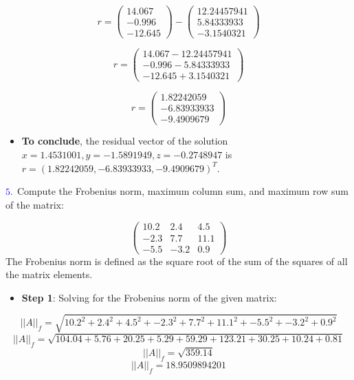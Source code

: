 \documentclass[
]{article}
\providecommand{\tightlist}{%
  \setlength{\itemsep}{0pt}\setlength{\parskip}{0pt}}
\begin{document}
\[r = 
  \begin{pmatrix}
    14.067 \\
    -0.996 \\
    -12.645 
  \end{pmatrix}
  -
  \begin{pmatrix}
    12.24457941\\
    5.84333933\\
    -3.1540321 
  \end{pmatrix}\]

\[r = 
  \begin{pmatrix}
    14.067 - 12.24457941 \\
    -0.996 - 5.84333933\\
    -12.645 +3.1540321
  \end{pmatrix}
  \]

\[r = 
  \begin{pmatrix}
    1.82242059 \\
    -6.83933933\\
    -9.4909679
  \end{pmatrix}
  \]

\begin{itemize}
\tightlist
\item
  \textbf{To conclude}, the residual vector of the solution
  \(x = 1.4531001, y = -1.5891949, z = -0.2748947\) is
  \(r = (1.82242059,-6.83933933,-9.4909679)^{T}\).
\end{itemize}

\(\textcolor{blue}{5.}\) Compute the Frobenius norm, maximum column sum,
and maximum row sum of the matrix:

\[
\begin{pmatrix}
10.2 & 2.4 & 4.5\\
-2.3 & 7.7 & 11.1\\
-5.5 & -3.2 & 0.9
\end{pmatrix}
\] The Frobenius norm is defined as the square root of the sum of the
squares of all the matrix elements.

\begin{itemize}
\tightlist
\item
  \textbf{Step 1}: Solving for the Frobenius norm of the given matrix:
\end{itemize}

\[||A||_f = \sqrt{10.2^2 + 2.4^2 + 4.5^2 + -2.3^2 + 7.7^2 + 11.1^2 + -5.5^2 + -3.2^2 + 0.9^2}\]
\[||A||_f = \sqrt{104.04 + 5.76 + 20.25 + 5.29 + 59.29 + 123.21 + 30.25 + 10.24 + 0.81}\]
\[||A||_f = \sqrt{359.14}\] \[||A||_f = 18.9509894201\]
\end{document}
